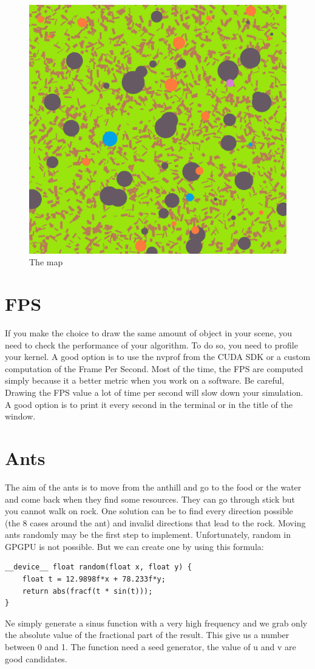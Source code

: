 \documentclass{article}
\begin{document}
\begin{figure}[H]
	\centering
	\includegraphics[scale=0.5]{figures/map.png}
	\caption{The map}
\end{figure}

\section{FPS}
If you make the choice to draw the same amount of object in your scene, you need to check the performance of your algorithm. To do so, you need to profile your kernel. A good option is to use the nvprof from the CUDA SDK or a custom computation of the Frame Per Second. Most of the time, the FPS are computed simply because it a better metric when you work on a software. Be careful, Drawing the FPS value a lot of time per second will slow down your simulation. A good option is to print it every second in the terminal or in the title of the window.

\section{Ants}
The aim of the ants is to move from the anthill and go to the food or the water and come back when they find some resources. They can go through stick but you cannot walk on rock. One solution can be to find every direction possible (the 8 cases around the ant) and invalid directions that lead to the rock. Moving ants randomly may be the first step to implement. Unfortunately, random in GPGPU is not possible. But we can create one by using this formula:
\begin{lstlisting}
__device__ float random(float x, float y) {
	float t = 12.9898f*x + 78.233f*y;
	return abs(fracf(t * sin(t)));
}
\end{lstlisting}
Ne simply generate a sinus function with a very high frequency and we grab only the absolute value of the fractional part of the result. This give us a number between 0 and 1. The function need a seed generator, the value of u and v are good candidates.
\end{document}
